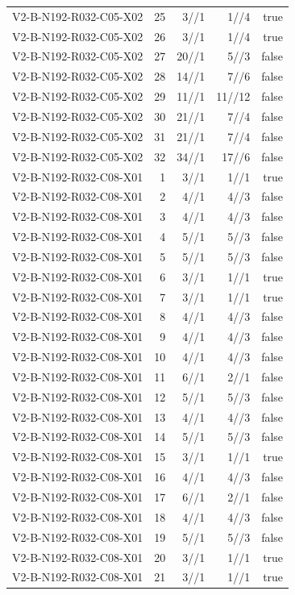 {\begin{longtable}{lrrrr}
V2-B-N192-R032-C05-X02 & 25 & 3//1 & 1//4 & true \\
V2-B-N192-R032-C05-X02 & 26 & 3//1 & 1//4 & true \\
V2-B-N192-R032-C05-X02 & 27 & 20//1 & 5//3 & false \\
V2-B-N192-R032-C05-X02 & 28 & 14//1 & 7//6 & false \\
V2-B-N192-R032-C05-X02 & 29 & 11//1 & 11//12 & false \\
V2-B-N192-R032-C05-X02 & 30 & 21//1 & 7//4 & false \\
V2-B-N192-R032-C05-X02 & 31 & 21//1 & 7//4 & false \\
V2-B-N192-R032-C05-X02 & 32 & 34//1 & 17//6 & false \\
V2-B-N192-R032-C08-X01 & 1 & 3//1 & 1//1 & true \\
V2-B-N192-R032-C08-X01 & 2 & 4//1 & 4//3 & false \\
V2-B-N192-R032-C08-X01 & 3 & 4//1 & 4//3 & false \\
V2-B-N192-R032-C08-X01 & 4 & 5//1 & 5//3 & false \\
V2-B-N192-R032-C08-X01 & 5 & 5//1 & 5//3 & false \\
V2-B-N192-R032-C08-X01 & 6 & 3//1 & 1//1 & true \\
V2-B-N192-R032-C08-X01 & 7 & 3//1 & 1//1 & true \\
V2-B-N192-R032-C08-X01 & 8 & 4//1 & 4//3 & false \\
V2-B-N192-R032-C08-X01 & 9 & 4//1 & 4//3 & false \\
V2-B-N192-R032-C08-X01 & 10 & 4//1 & 4//3 & false \\
V2-B-N192-R032-C08-X01 & 11 & 6//1 & 2//1 & false \\
V2-B-N192-R032-C08-X01 & 12 & 5//1 & 5//3 & false \\
V2-B-N192-R032-C08-X01 & 13 & 4//1 & 4//3 & false \\
V2-B-N192-R032-C08-X01 & 14 & 5//1 & 5//3 & false \\
V2-B-N192-R032-C08-X01 & 15 & 3//1 & 1//1 & true \\
V2-B-N192-R032-C08-X01 & 16 & 4//1 & 4//3 & false \\
V2-B-N192-R032-C08-X01 & 17 & 6//1 & 2//1 & false \\
V2-B-N192-R032-C08-X01 & 18 & 4//1 & 4//3 & false \\
V2-B-N192-R032-C08-X01 & 19 & 5//1 & 5//3 & false \\
V2-B-N192-R032-C08-X01 & 20 & 3//1 & 1//1 & true \\
V2-B-N192-R032-C08-X01 & 21 & 3//1 & 1//1 & true \\

\end{longtable}}
